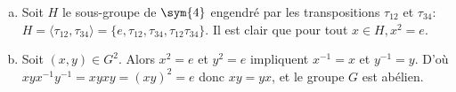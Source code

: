 \begin{enumerate}[a)]
\item Soit $H$ le sous-groupe de $\sym{4}$ engendré par les transpositions
$\tau_{12}$ et $\tau_{34}$:
$H=\langle\tau_{12},\tau_{34}\rangle=\{e,\tau_{12},\tau_{34},
\tau_{12}\tau_{34}\}$. Il est clair que pour tout $x\in H, x^2=e$.  

\item Soit $(x,y)\in G^2$. Alors $x^2=e$ et $y^2=e$ impliquent $x^{-1}=x$ et
$y^{-1}=y$.  D'où $xyx^{-1}y^{-1}=xyxy=(xy)^2=e$ donc $xy=yx$, et le groupe $G$
est abélien.
\end{enumerate}
